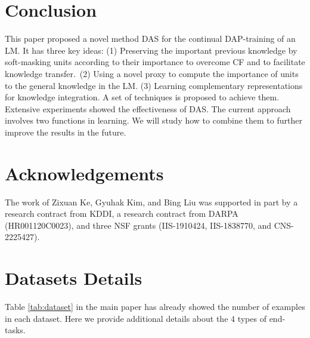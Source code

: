 \documentclass{article} \usepackage{iclr2023_conference,times}
\begin{document}
\vspace{-1mm}
\section{Conclusion}
\vspace{-1mm}
This paper proposed a novel method DAS for the continual DAP-training of an LM. {\color{black}It has three key ideas: (1) Preserving the important previous knowledge by soft-masking units according to their importance to overcome CF and to facilitate knowledge transfer.~(2) Using a novel proxy to compute the importance of units to the general knowledge in the LM.} (3) Learning complementary representations for knowledge integration. A set of techniques is proposed to achieve them. Extensive experiments showed the effectiveness of DAS. {\color{black}The current approach involves two functions in learning. We will study how to combine them to further improve the results in the future.} 

\section*{Acknowledgements}
The work of Zixuan Ke, Gyuhak Kim, and Bing Liu was supported in part by a research contract from KDDI, a research contract from DARPA (HR001120C0023), and three NSF grants (IIS-1910424, IIS-1838770, and CNS-2225427). 














\appendix
\null\newpage 




















\section{Datasets Details}
\label{ap:dataset}
Table \ref{tab:dataset} in the main paper has already showed the number of examples in each dataset. Here we provide additional details about the 4 types of end-tasks.
\end{document}
